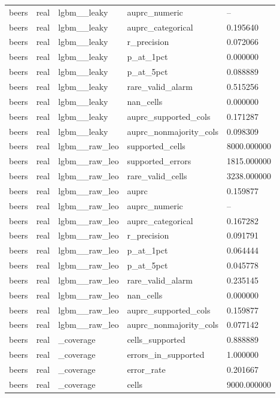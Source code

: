 \begin{tabular}{lllll}
beers & real & lgbm\_\_leaky & auprc\_numeric & -- \\
beers & real & lgbm\_\_leaky & auprc\_categorical & 0.195640 \\
beers & real & lgbm\_\_leaky & r\_precision & 0.072066 \\
beers & real & lgbm\_\_leaky & p\_at\_1pct & 0.000000 \\
beers & real & lgbm\_\_leaky & p\_at\_5pct & 0.088889 \\
beers & real & lgbm\_\_leaky & rare\_valid\_alarm & 0.515256 \\
beers & real & lgbm\_\_leaky & nan\_cells & 0.000000 \\
beers & real & lgbm\_\_leaky & auprc\_supported\_cols & 0.171287 \\
beers & real & lgbm\_\_leaky & auprc\_nonmajority\_cols & 0.098309 \\
beers & real & lgbm\_\_raw\_leo & supported\_cells & 8000.000000 \\
beers & real & lgbm\_\_raw\_leo & supported\_errors & 1815.000000 \\
beers & real & lgbm\_\_raw\_leo & rare\_valid\_cells & 3238.000000 \\
beers & real & lgbm\_\_raw\_leo & auprc & 0.159877 \\
beers & real & lgbm\_\_raw\_leo & auprc\_numeric & -- \\
beers & real & lgbm\_\_raw\_leo & auprc\_categorical & 0.167282 \\
beers & real & lgbm\_\_raw\_leo & r\_precision & 0.091791 \\
beers & real & lgbm\_\_raw\_leo & p\_at\_1pct & 0.064444 \\
beers & real & lgbm\_\_raw\_leo & p\_at\_5pct & 0.045778 \\
beers & real & lgbm\_\_raw\_leo & rare\_valid\_alarm & 0.235145 \\
beers & real & lgbm\_\_raw\_leo & nan\_cells & 0.000000 \\
beers & real & lgbm\_\_raw\_leo & auprc\_supported\_cols & 0.159877 \\
beers & real & lgbm\_\_raw\_leo & auprc\_nonmajority\_cols & 0.077142 \\
beers & real & \_coverage & cells\_supported & 0.888889 \\
beers & real & \_coverage & errors\_in\_supported & 1.000000 \\
beers & real & \_coverage & error\_rate & 0.201667 \\
beers & real & \_coverage & cells & 9000.000000 \\

\end{tabular}
